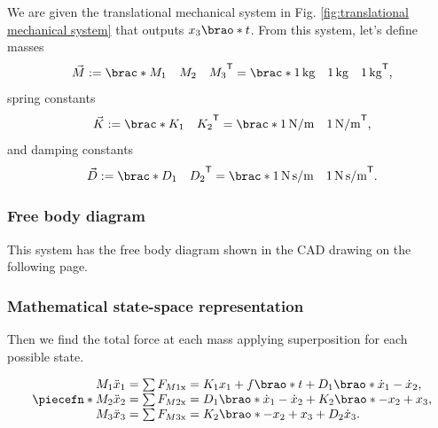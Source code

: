 \documentclass[12pt]{article}
\newcommand*\transpose{\mathsf{T}}
\DeclarePairedDelimiter\brao()%
\DeclarePairedDelimiter\brac[]%
\DeclarePairedDelimiter\piecefn\{.
\begin{document}
We are given the translational mechanical system
in Fig. \ref{fig:translational mechanical system}
that outputs $x_3\brao*t$.
From this system, let's define masses
\begin{equation}
    \vec{M} := \brac*{
        \begin{matrix} M_1 & M_2 & M_3 \end{matrix}
    }^\transpose = \brac*{
        \begin{matrix} \SI1{\kilo\gram} & \SI1{\kilo\gram} & \SI1{\kilo\gram} \end{matrix}
    }^\transpose\rlap,
\end{equation}
spring constants
\begin{equation}
    \vec{K} := \brac*{
        \begin{matrix} K_1 & K_2 \end{matrix}
    }^\transpose = \brac*{
        \begin{matrix} \SI1{\newton\per\meter} & \SI1{\newton\per\meter} \end{matrix}
    }^\transpose\rlap,
\end{equation}
and damping constants
\begin{equation}
    \vec{D} := \brac*{
        \begin{matrix} D_1 & D_2 \end{matrix}
    }^\transpose = \brac*{
        \begin{matrix} \SI1{\newton\second\per\meter} & \SI1{\newton\second\per\meter} \end{matrix}
    }^\transpose\rlap.
\end{equation}

\subsubsection{Free body diagram}
This system has the free body diagram shown in the CAD drawing on the following page.


\subsubsection{Mathematical state-space representation}

Then we find the total force at each mass applying superposition for each possible state.

\begin{equation}
    \piecefn*{
        \begin{array}{@{}l@{}}
            M_1 \ddot{x}_1 = \sum F_{M1\mathrm{x}} = K_1 x_1 + f\brao*t + D_1 \brao*{\dot{x}_1 - \dot{x}_2}\rlap,
        \\*
            M_2 \ddot{x}_2 = \sum F_{M2\mathrm{x}} = D_1\brao*{\dot{x}_1 - \dot{x}_2} + K_2\brao*{-x_2 + x_3}\rlap,
        \\*
            M_3 \ddot{x}_3 = \sum F_{M3\mathrm{x}} = K_2\brao*{-x_2 + x_3} + D_2\dot{x}_3\rlap.
        \\*
        \end{array}
    }
\end{equation}
\end{document}

